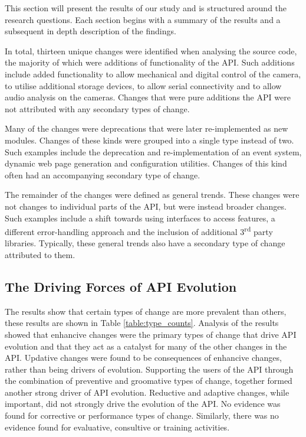 \documentclass{sig-alternate}
\begin{document}
This section will present the results of our study and is structured around the research questions. Each section begins with a summary of the results and a subsequent in depth description of the findings.

In total, thirteen unique changes were identified when analysing the source code, the majority of which were additions of functionality of the API. Such additions include added functionality to allow mechanical and digital control of the camera, to utilise additional storage devices, to allow serial connectivity and to allow audio analysis on the cameras. Changes that were pure additions the API were not attributed with any secondary types of change.

Many of the changes were deprecations that were later re-implemented as new modules. Changes of these kinds were grouped into a single type instead of two. Such examples include the deprecation and re-implementation of an event system, dynamic web page generation and configuration utilities. Changes of this kind often had an accompanying secondary type of change.

The remainder of the changes were defined as general trends. These changes were not changes to individual parts of the API, but were instead broader changes. Such examples include a shift towards using interfaces to access features, a different error-handling approach and the inclusion of additional 3\textsuperscript{rd} party libraries. Typically, these general trends also have a secondary type of change attributed to them.



\subsection{The Driving Forces of API Evolution} \label{results_rq1}

The results show that certain types of change are more prevalent than others, these results are shown in Table \ref{table:type_counts}. Analysis of the results showed that enhancive changes were the primary types of change that drive API evolution and that they act as a catalyst for many of the other changes in the API. Updative changes were found to be consequences of enhancive changes, rather than being drivers of evolution. Supporting the users of the API through the combination of preventive and groomative types of change, together formed another strong driver of API evolution. Reductive and adaptive changes, while important, did not strongly drive the evolution of the API. No evidence was found for corrective or performance types of change. Similarly, there was no evidence found for evaluative, consultive or training activities.    
\end{document}
